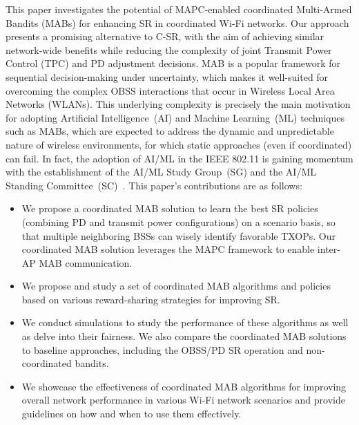 This paper investigates the potential of MAPC-enabled coordinated Multi-Armed Bandits (MABs) for enhancing SR in coordinated Wi-Fi networks. Our approach presents a promising alternative to C-SR, with the aim of achieving similar network-wide benefits while reducing the complexity of joint Transmit Power Control (TPC) and PD adjustment decisions. MAB is a popular framework for sequential decision-making under uncertainty, which makes it well-suited for overcoming the complex OBSS interactions that occur in Wireless Local Area Networks (WLANs). This underlying complexity is precisely the main motivation for adopting Artificial Intelligence~(AI) and Machine Learning~(ML) techniques such as MABs, which are expected to address the dynamic and unpredictable nature of wireless environments, for which static approaches (even if coordinated) can fail. In fact, the adoption of AI/ML in the IEEE 802.11 is gaining momentum with the establishment of the AI/ML Study Group~(SG) and the AI/ML Standing Committee~(SC)~\cite{wilhelmi2024machine}. This paper's contributions are as follows:
\begin{itemize}
    \item We propose a coordinated MAB solution to learn the best SR policies (combining PD and transmit power configurations) on a scenario basis, so that multiple neighboring BSSs can wisely identify favorable TXOPs. Our coordinated MAB solution leverages the MAPC framework to enable inter-AP MAB communication.
    \item We propose and study a set of coordinated MAB algorithms and policies based on various reward-sharing strategies for improving SR. 
    \item We conduct simulations to study the performance of these algorithms as well as delve into their fairness. We also compare the coordinated MAB solutions to baseline approaches, including the OBSS/PD SR operation and non-coordinated bandits.
    \item We showcase the effectiveness of coordinated MAB algorithms for improving overall network performance in various Wi-Fi network scenarios and provide guidelines on how and when to use them effectively. 
\end{itemize}